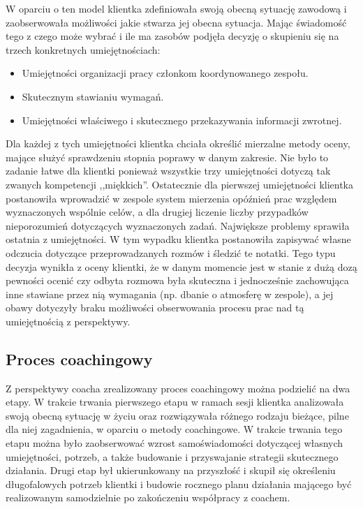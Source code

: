 W oparciu o ten model klientka zdefiniowała swoją obecną sytuację zawodową i zaobserwowała możliwości jakie stwarza jej obecna sytuacja. Mając świadomość
tego z czego może wybrać i ile ma zasobów podjęła decyzję o skupieniu się na trzech konkretnych umiejętnościach:
\begin{itemize}
  \item Umiejętności organizacji pracy członkom koordynowanego zespołu.
  \item Skutecznym stawianiu wymagań.
  \item Umiejętności właściwego i skutecznego przekazywania informacji zwrotnej.
\end{itemize}

Dla każdej z tych umiejętności klientka chciała określić mierzalne metody oceny, mające służyć sprawdzeniu stopnia poprawy w danym zakresie. Nie było
to zadanie łatwe dla klientki ponieważ wszystkie trzy umiejętności dotyczą tak zwanych kompetencji ,,miękkich''. Ostatecznie dla pierwszej umiejętności
klientka postanowiła wprowadzić w zespole system mierzenia opóźnień prac względem wyznaczonych wspólnie celów, a dla drugiej liczenie liczby przypadków
nieporozumień dotyczących wyznaczonych zadań. Największe problemy sprawiła ostatnia z umiejętności. W tym wypadku klientka postanowiła zapisywać własne
odczucia dotyczące przeprowadzanych rozmów i śledzić te notatki. Tego typu decyzja wynikła z oceny klientki, że w danym momencie jest w stanie z dużą
dozą pewności ocenić czy odbyta rozmowa była skuteczna i jednocześnie zachowująca inne stawiane przez nią wymagania (np. dbanie o atmosferę w zespole),
a jej obawy dotyczyły braku możliwości obserwowania procesu prac nad tą umiejętnością z perspektywy.

\subsection{Proces coachingowy}

Z perspektywy coacha zrealizowany proces coachingowy można podzielić na dwa etapy. W trakcie trwania pierwszego etapu w ramach sesji klientka
analizowała swoją obecną sytuację w życiu oraz rozwiązywała różnego rodzaju bieżące, pilne dla niej zagadnienia, w oparciu o metody coachingowe.
W trakcie trwania tego etapu można było zaobserwować wzrost samoświadomości dotyczącej własnych umiejętności, potrzeb, a także budowanie i przyswajanie
strategii skutecznego działania. Drugi etap był ukierunkowany na przyszłość i skupił się określeniu długofalowych potrzeb klientki i budowie rocznego
planu działania mającego być realizowanym samodzielnie po zakończeniu współpracy z coachem.

